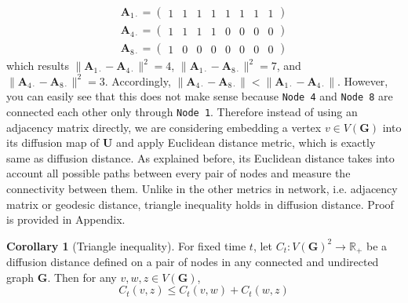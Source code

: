 \documentclass[12pt]{article}
\theoremstyle{definition}
\newtheorem{corollary}{Corollary}[theorem]
\begin{document}
\begin{equation}
	\begin{gathered}
	\boldsymbol{A}_{1 \cdot} = \left( \begin{array}{rrrrrrrr} 1 & 1 & 1 & 1 & 1 & 1 & 1 & 1 \end{array} \right) \\
	\boldsymbol{A}_{4 \cdot} = \left( \begin{array}{rrrrrrrr} 1 & 1 & 1 & 1 & 0 & 0 & 0 & 0 \end{array} \right) \\
	\boldsymbol{A}_{8 \cdot} = \left( \begin{array}{rrrrrrrr} 1 & 0 & 0 & 0 & 0 & 0 & 0 & 0 \end{array} \right)
	\end{gathered}
\end{equation}
which results $\parallel \boldsymbol{A}_{1 \cdot} -\boldsymbol{A}_{4 \cdot} \parallel^2 = 4$,  $\parallel \boldsymbol{A}_{1 \cdot} -\boldsymbol{A}_{8 \cdot} \parallel^2 = 7$, and $\parallel \boldsymbol{A}_{4 \cdot} -\boldsymbol{A}_{8 \cdot} \parallel^2 = 3.$ Accordingly, $\parallel \boldsymbol{A}_{4 \cdot} -\boldsymbol{A}_{8 \cdot} \parallel  < \parallel \boldsymbol{A}_{1 \cdot} -\boldsymbol{A}_{4 \cdot} \parallel$. However, you can easily see that this does not make sense because \texttt{Node 4} and \texttt{Node 8} are connected each other only through \texttt{Node 1}. 
Therefore instead of using an adjacency matrix directly, we are considering embedding a vertex $v \in V(\boldsymbol{G})$ into its diffusion map of $\boldsymbol{U}$ and apply Euclidean distance metric, which is exactly same as diffusion distance. As explained before, its Euclidean distance takes into account all possible paths between every pair of nodes and measure the connectivity between them. Unlike in the other metrics in network, i.e. adjacency matrix or geodesic distance, triangle inequality holds in diffusion distance. Proof is provided in Appendix.
\begin{corollary}[Triangle inequality]
	\label{corollary1}
		For fixed time $t$, let $C_{t} : V(\mathbf{G})^2 \rightarrow \mathbb{R}_{+}$ be a diffusion distance defined on a pair of nodes in any connected and undirected graph $\mathbf{G}$. Then for any $v, w, z \in V(\mathbf{G})$,  
		\begin{equation}
		C_{t}(v,z) \leq C_{t}(v,w) + C_{t}(w,z)
\end{equation}
\end{corollary}	
	
\end{document}
